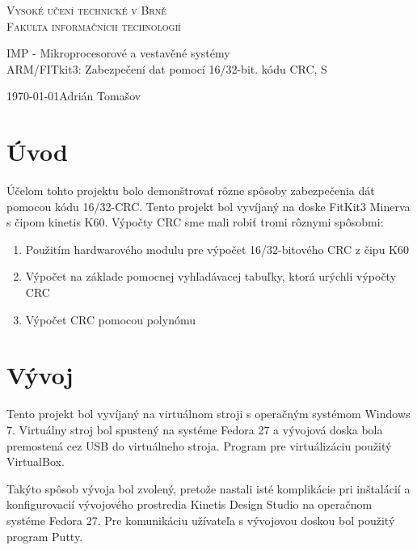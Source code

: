 \documentclass[a4paper, 11pt]{article}
\begin{document}
\begin{center}
\thispagestyle{empty}
\Huge
\textsc{Vysoké učení technické v Brně\\
\huge Fakulta informačních technologií\\}

\LARGE IMP -  Mikroprocesorové a vestavěné systémy\\
\Huge ARM/FITkit3: Zabezpečení dat pomocí 16/32-bit. kódu CRC, S 
\end{center}
{\LARGE \today \hfill Adrián Tomašov}
\pagebreak

\tableofcontents
\pagebreak

\setcounter{page}{1}


\section{Úvod}
Účelom tohto projektu bolo demonštrovať rôzne spôsoby zabezpečenia dát pomocou kódu 16/32-CRC. Tento projekt bol vyvíjaný na doske FitKit3 Minerva s čipom kinetis K60. Výpočty CRC sme mali robiť tromi rôznymi spôsobmi:
 \begin{enumerate}
	\item Použitím hardwarového modulu pre výpočet 16/32-bitového CRC z čipu K60
	\item Výpočet na základe pomocnej vyhľadávacej tabuľky, ktorá urýchli výpočty CRC
	\item Výpočet CRC pomocou polynómu
\end{enumerate}



\section{Vývoj}
Tento projekt bol vyvíjaný na virtuálnom stroji s operačným systémom Windows 7. Virtuálny stroj bol spustený na systéme Fedora 27 a vývojová doska bola premostená cez USB do virtuálneho stroja. Program pre virtuálizáciu použitý VirtualBox.

Takýto spôsob vývoja bol zvolený, pretože nastali isté komplikácie pri inštalácií a konfigurovacií vývojového prostredia Kinetis Design Studio na operačnom systéme Fedora 27. Pre komunikáciu užívateľa s vývojovou doskou bol použitý program Putty.
\end{document}
